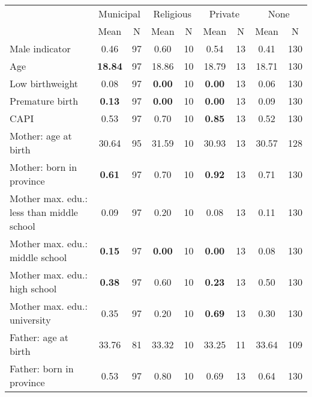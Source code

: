\begin{tabular}{l c c c c c c c c}
\toprule
& \multicolumn{2}{c}{Municipal} & \multicolumn{2}{c}{Religious} & \multicolumn{2}{c}{Private} & \multicolumn{2}{c}{None} \\
& \scriptsize Mean & \scriptsize N & \scriptsize Mean & \scriptsize N & \scriptsize Mean & \scriptsize N & \scriptsize Mean & \scriptsize N \\
\midrule
Male indicator &      0.46 &        97 &      0.60 &        10 &      0.54 &        13 &      0.41 &       130 \\
Age & \textbf{    18.84} &        97 &     18.86 &        10 &     18.79 &        13 &     18.71 &       130 \\
Low birthweight &      0.08 &        97 & \textbf{     0.00} &        10 & \textbf{     0.00} &        13 &      0.06 &       130 \\
Premature birth & \textbf{     0.13} &        97 & \textbf{     0.00} &        10 & \textbf{     0.00} &        13 &      0.09 &       130 \\
CAPI &      0.53 &        97 &      0.70 &        10 & \textbf{     0.85} &        13 &      0.52 &       130 \\
Mother: age at birth &     30.64 &        95 &     31.59 &        10 &     30.93 &        13 &     30.57 &       128 \\
Mother: born in province & \textbf{     0.61} &        97 &      0.70 &        10 & \textbf{     0.92} &        13 &      0.71 &       130 \\
Mother max. edu.: less than middle school &      0.09 &        97 &      0.20 &        10 &      0.08 &        13 &      0.11 &       130 \\
Mother max. edu.: middle school & \textbf{     0.15} &        97 & \textbf{     0.00} &        10 & \textbf{     0.00} &        13 &      0.08 &       130 \\
Mother max. edu.: high school & \textbf{     0.38} &        97 &      0.60 &        10 & \textbf{     0.23} &        13 &      0.50 &       130 \\
Mother max. edu.: university &      0.35 &        97 &      0.20 &        10 & \textbf{     0.69} &        13 &      0.30 &       130 \\
Father: age at birth &     33.76 &        81 &     33.32 &        10 &     33.25 &        11 &     33.64 &       109 \\
Father: born in province &      0.53 &        97 &      0.80 &        10 &      0.69 &        13 &      0.64 &       130 \\

\end{tabular}
